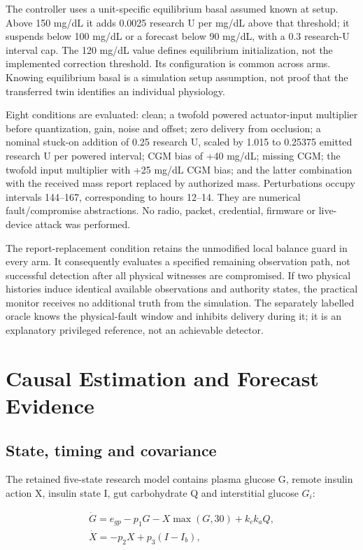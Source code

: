 \documentclass[journal,10pt,letterpaper]{IEEEtran}
\begin{document}
The controller uses a unit-specific equilibrium basal assumed known at
setup. Above 150 mg/dL it adds 0.0025 research U per mg/dL above that
threshold; it suspends below 100 mg/dL or a forecast below 90 mg/dL,
with a 0.3 research-U interval cap. The 120 mg/dL value defines
equilibrium initialization, not the implemented correction threshold.
Its configuration is common across arms. Knowing equilibrium basal is a
simulation setup assumption, not proof that the transferred twin
identifies an individual physiology.

Eight conditions are evaluated: clean; a twofold powered actuator-input
multiplier before quantization, gain, noise and offset; zero delivery
from occlusion; a nominal stuck-on addition of 0.25 research U, scaled
by 1.015 to 0.25375 emitted research U per powered interval; CGM bias of
+40 mg/dL; missing CGM; the twofold input multiplier with +25 mg/dL CGM
bias; and the latter combination with the received mass report replaced
by authorized mass. Perturbations occupy intervals 144--167,
corresponding to hours 12--14. They are numerical fault/compromise
abstractions. No radio, packet, credential, firmware or live-device
attack was performed.

The report-replacement condition retains the unmodified local balance
guard in every arm. It consequently evaluates a specified remaining
observation path, not successful detection after all physical witnesses
are compromised. If two physical histories induce identical available
observations and authority states, the practical monitor receives no
additional truth from the simulation. The separately labelled oracle
knows the physical-fault window and inhibits delivery during it; it is
an explanatory privileged reference, not an achievable detector.

\section{Causal Estimation and Forecast Evidence}

\subsection{State, timing and covariance}

The retained five-state research model contains plasma glucose G, remote
insulin action X, insulin state I, gut carbohydrate Q and interstitial
glucose \(G_i\):

\[\begin{gathered}
\dot G=e_{gp}-p_1G-X\max(G,30)+k_c k_aQ,\\
\dot X=-p_2X+p_3(I-I_b),
\end{gathered}\]
\end{document}
